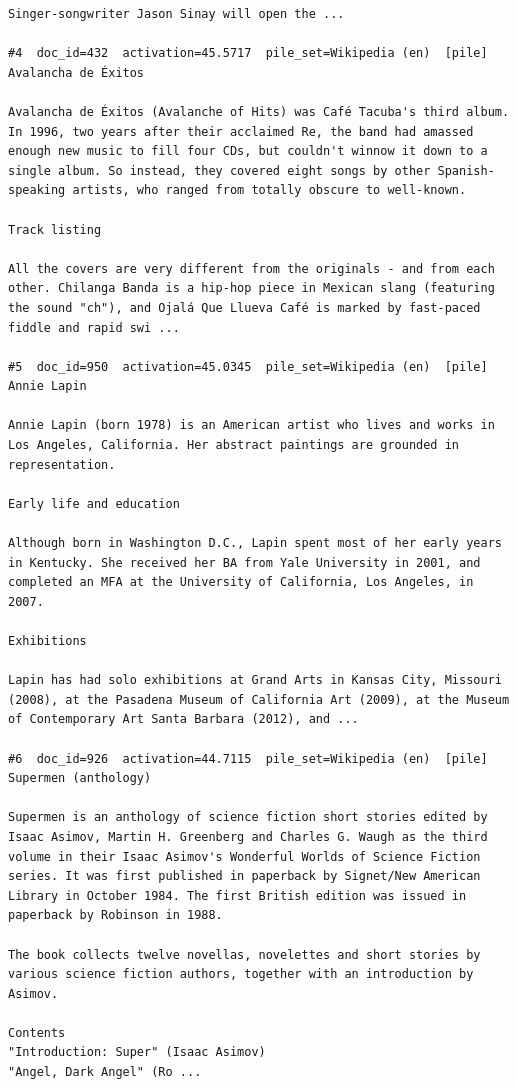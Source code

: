 \begin{verbatim}
Singer-songwriter Jason Sinay will open the ...

#4  doc_id=432  activation=45.5717  pile_set=Wikipedia (en)  [pile]
Avalancha de Éxitos

Avalancha de Éxitos (Avalanche of Hits) was Café Tacuba's third album. In 1996, two years after their acclaimed Re, the band had amassed enough new music to fill four CDs, but couldn't winnow it down to a single album. So instead, they covered eight songs by other Spanish-speaking artists, who ranged from totally obscure to well-known.

Track listing

All the covers are very different from the originals - and from each other. Chilanga Banda is a hip-hop piece in Mexican slang (featuring the sound "ch"), and Ojalá Que Llueva Café is marked by fast-paced fiddle and rapid swi ...

#5  doc_id=950  activation=45.0345  pile_set=Wikipedia (en)  [pile]
Annie Lapin

Annie Lapin (born 1978) is an American artist who lives and works in Los Angeles, California. Her abstract paintings are grounded in representation.

Early life and education 

Although born in Washington D.C., Lapin spent most of her early years in Kentucky. She received her BA from Yale University in 2001, and completed an MFA at the University of California, Los Angeles, in 2007.

Exhibitions 

Lapin has had solo exhibitions at Grand Arts in Kansas City, Missouri (2008), at the Pasadena Museum of California Art (2009), at the Museum of Contemporary Art Santa Barbara (2012), and ...

#6  doc_id=926  activation=44.7115  pile_set=Wikipedia (en)  [pile]
Supermen (anthology)

Supermen is an anthology of science fiction short stories edited by Isaac Asimov, Martin H. Greenberg and Charles G. Waugh as the third volume in their Isaac Asimov's Wonderful Worlds of Science Fiction series. It was first published in paperback by Signet/New American Library in October 1984. The first British edition was issued in paperback by Robinson in 1988.

The book collects twelve novellas, novelettes and short stories by various science fiction authors, together with an introduction by Asimov.

Contents
"Introduction: Super" (Isaac Asimov)
"Angel, Dark Angel" (Ro ...


\end{verbatim}
